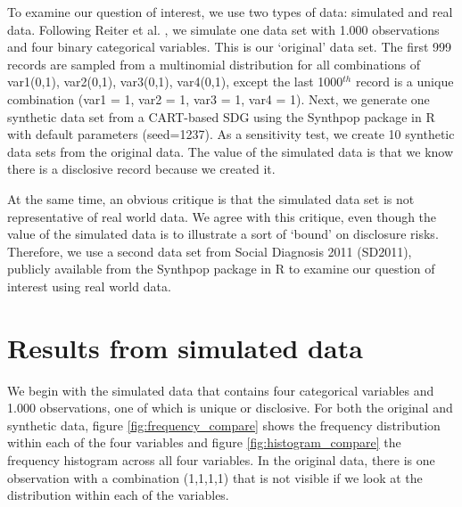 \documentclass[a4paper,11pt]{style/uneceart}
\begin{document}
To examine our question of interest, we use two types of data: simulated and real data.  Following Reiter et al. \cite{reiter2014bayesian}, we simulate one data set with 1.000 observations and four binary categorical variables.  This is our `original' data set.  The first 999 records are sampled from a multinomial distribution for all combinations of var1(0,1), var2(0,1), var3(0,1), var4(0,1), except the last 1000$^{th}$ record is a unique combination (var1 = 1, var2 = 1, var3 = 1, var4 = 1).  Next, we generate one synthetic data set from a CART-based SDG using the Synthpop package in R with default parameters (seed=1237).  As a sensitivity test, we create 10 synthetic data sets from the original data.  The value of the simulated data is that we know there is a disclosive record because we created it.

At the same time, an obvious critique is that the simulated data set is not representative of real world data.  We agree with this critique, even though the value of the simulated data is to illustrate a sort of `bound' on disclosure risks.  Therefore, we use a second data set from Social Diagnosis 2011 (SD2011), publicly available from the Synthpop package in R to examine our question of interest using real world data.

\section{Results from simulated data}

We begin with the simulated data that contains four categorical variables and 1.000 observations, one of which is unique or disclosive. For both the original and synthetic data, figure \ref{fig:frequency_compare} shows the frequency distribution within each of the four variables and figure \ref{fig:histogram_compare} the frequency histogram across all four variables.  In the original data, there is one observation with a combination (1,1,1,1) that is not visible if we look at the distribution within each of the variables.  
\end{document}
